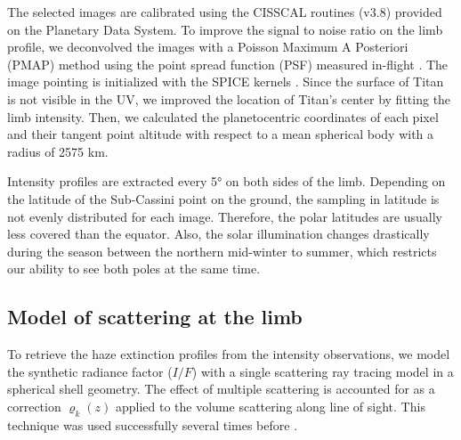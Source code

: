 The selected images are calibrated using the CISSCAL routines (v3.8) provided on the Planetary Data System. To improve
the signal to noise ratio on the limb profile, we deconvolved the images with a Poisson Maximum A Posteriori
(PMAP) method using the point spread function (PSF) measured in-flight \citep{West2010, Knowles2020}.
The image pointing is initialized with the SPICE kernels \citep{Acton1996, Annex2020}. Since the surface of Titan is not visible in the UV, we improved
the location of Titan's center by fitting the limb intensity. Then, we calculated the planetocentric coordinates of each
pixel and their tangent point altitude with respect to a mean spherical body with a radius of 2575 km.

Intensity profiles are extracted every \ang{5} on both sides of the limb. Depending on the
latitude of the Sub-Cassini point on the ground, the sampling in latitude is not evenly distributed for each image.
Therefore, the polar latitudes are usually less covered than the equator.
Also, the solar illumination changes drastically during the
season between the northern mid-winter to summer, which restricts our ability to see both poles at the same time.


\subsection{Model of scattering at the limb}

To retrieve the haze extinction profiles from the intensity observations, we model the synthetic
radiance factor ($I/F$) with a single scattering ray tracing model in a spherical shell geometry.
The effect of multiple scattering is accounted for as a correction $\varrho_k (z)$
applied to the volume scattering along line of sight.
This technique was used successfully several times before \citep[\eg][]{Rages1983, Rannou1997, Seignovert2017, West2018}.

